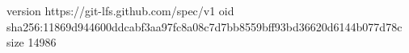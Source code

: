version https://git-lfs.github.com/spec/v1
oid sha256:11869d944600ddcabf3aa97fc8a08c7d7bb8559bff93bd36620d6144b077d78c
size 14986
